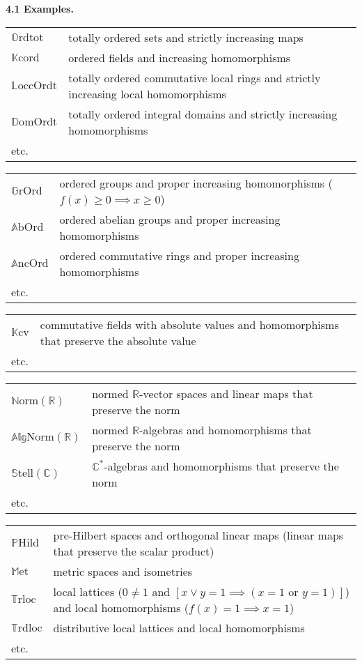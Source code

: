 \documentclass{article}
\newenvironment{rmenv}[1]
  {\phantomsection\par\medskip\noindent\textbf{#1.}\rmfamily}
  {\medskip}
\newcommand{\bb}[1]{{\mathbb{#1}}}
\renewcommand{\geq}{\geqslant}
\begin{document}
\begin{rmenv}{4.1 Examples}
\begin{longtable}{p{0.5in}p{4.4in}}
  \\$\bb{O}\mathrm{rdtot}$ & totally ordered sets and strictly increasing maps
  \\$\bb{K}\mathrm{cord}$ & ordered fields and increasing homomorphisms
  \\$\bb{L}\mathrm{occOrdt}$ & totally ordered commutative local rings and strictly increasing local homomorphisms
  \\$\bb{D}\mathrm{omOrdt}$ & totally ordered integral domains and strictly increasing homomorphisms
  \\etc.
  \end{longtable}
  \begin{longtable}{p{0.5in}p{4.4in}}
    $\bb{G}\mathrm{rOrd}$ & ordered groups and proper increasing homomorphisms ($f(x)\geq0\implies x\geq0$)
  \\$\bb{A}\mathrm{bOrd}$ & ordered abelian groups and proper increasing homomorphisms
  \\$\bb{A}\mathrm{ncOrd}$ & ordered commutative rings and proper increasing homomorphisms
  \\etc.
  \end{longtable}
  \begin{longtable}{p{0.5in}p{4.4in}}
    $\bb{K}\mathrm{cv}$ & commutative fields with absolute values and homomorphisms that preserve the absolute value
  \\etc.
  \end{longtable}
  \begin{longtable}{p{0.5in}p{4.4in}}
    $\bb{N}\mathrm{orm}(\bb{R})$ & normed $\bb{R}$-vector spaces and linear maps that preserve the norm
  \\$\bb{Alg}\mathrm{Norm}(\bb{R})$ & normed $\bb{R}$-algebras and homomorphisms that preserve the norm
  \\$\bb{S}\mathrm{tell}(\bb{C})$ & $\bb{C}^*$-algebras and homomorphisms that preserve the norm
  \\etc.
  \end{longtable}
  \begin{longtable}{p{0.5in}p{4.4in}}
    $\bb{P}\mathrm{Hild}$ & pre-Hilbert spaces and orthogonal linear maps (linear maps that preserve the scalar product)
  \\$\bb{M}\mathrm{et}$ & metric spaces and isometries
  \\$\bb{T}\mathrm{rloc}$ & local lattices ($0\neq1$ and $[x\vee y=1\implies(\mbox{$x=1$ or $y=1$})]$) and local homomorphisms ($f(x)=1\implies x=1$)
  \\$\bb{T}\mathrm{rdloc}$ & distributive local lattices and local homomorphisms
  \\etc.
  \end{longtable}
\end{rmenv}
\end{document}
